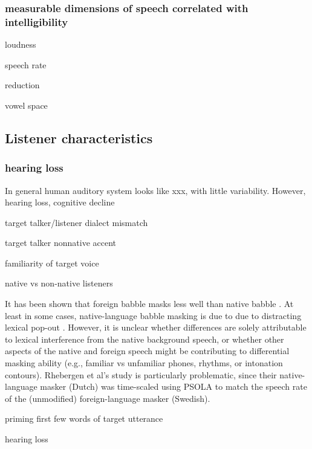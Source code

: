 \subsubsection{measurable dimensions of speech correlated with intelligibility}
\begin{itm}
	\item{loudness}
	\item{speech rate}
	\item{reduction}
	\item{vowel space}
\end{itm}

\subsection{Listener characteristics}
\subsubsection{hearing loss}
In general human auditory system looks like xxx, with little variability.  However, hearing loss, cognitive decline

\begin{itm}
	\item{target talker/listener dialect mismatch}
	\item{target talker nonnative accent}
	\item{familiarity of target voice}
	\item{native vs non-native listeners \citep{CookeEtAl2008, CookeEtAl2010, BrouwerEtAl2012}}
	\item{It has been shown that foreign babble masks less well than native babble \citep{RhebergenEtAl2005,VanEngenBradlow2007,WuEtAl2011}.  At least in some cases, native-language babble masking is due to due to distracting lexical pop-out \citep{HoenEtAl2007}.  However, it is unclear whether differences are solely attributable to lexical interference from the native background speech, or whether other aspects of the native and foreign speech might be contributing to differential masking ability (e.g., familiar vs unfamiliar phones, rhythms, or intonation contours). Rhebergen et al's study is particularly problematic, since their native-language masker (Dutch) was time-scaled using PSOLA to match the speech rate of the (unmodified) foreign-language masker (Swedish).}
	\item{priming first few words of target utterance \citep{FreymanEtAl2004}}
	\item{hearing loss}
\end{itm}

